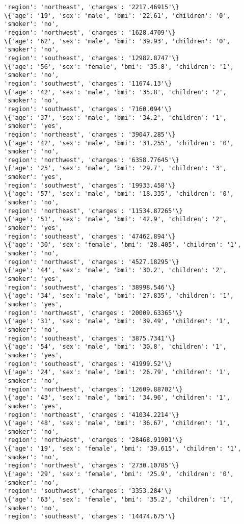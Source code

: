 \documentclass[11pt]{article}
\begin{document}
\begin{Verbatim}[commandchars=\\\{\}]
'region': 'northeast', 'charges': '2217.46915'\}
\{'age': '19', 'sex': 'male', 'bmi': '22.61', 'children': '0', 'smoker': 'no',
'region': 'northwest', 'charges': '1628.4709'\}
\{'age': '62', 'sex': 'male', 'bmi': '39.93', 'children': '0', 'smoker': 'no',
'region': 'southeast', 'charges': '12982.8747'\}
\{'age': '56', 'sex': 'female', 'bmi': '35.8', 'children': '1', 'smoker': 'no',
'region': 'southwest', 'charges': '11674.13'\}
\{'age': '42', 'sex': 'male', 'bmi': '35.8', 'children': '2', 'smoker': 'no',
'region': 'southwest', 'charges': '7160.094'\}
\{'age': '37', 'sex': 'male', 'bmi': '34.2', 'children': '1', 'smoker': 'yes',
'region': 'northeast', 'charges': '39047.285'\}
\{'age': '42', 'sex': 'male', 'bmi': '31.255', 'children': '0', 'smoker': 'no',
'region': 'northwest', 'charges': '6358.77645'\}
\{'age': '25', 'sex': 'male', 'bmi': '29.7', 'children': '3', 'smoker': 'yes',
'region': 'southwest', 'charges': '19933.458'\}
\{'age': '57', 'sex': 'male', 'bmi': '18.335', 'children': '0', 'smoker': 'no',
'region': 'northeast', 'charges': '11534.87265'\}
\{'age': '51', 'sex': 'male', 'bmi': '42.9', 'children': '2', 'smoker': 'yes',
'region': 'southeast', 'charges': '47462.894'\}
\{'age': '30', 'sex': 'female', 'bmi': '28.405', 'children': '1', 'smoker': 'no',
'region': 'northwest', 'charges': '4527.18295'\}
\{'age': '44', 'sex': 'male', 'bmi': '30.2', 'children': '2', 'smoker': 'yes',
'region': 'southwest', 'charges': '38998.546'\}
\{'age': '34', 'sex': 'male', 'bmi': '27.835', 'children': '1', 'smoker': 'yes',
'region': 'northwest', 'charges': '20009.63365'\}
\{'age': '31', 'sex': 'male', 'bmi': '39.49', 'children': '1', 'smoker': 'no',
'region': 'southeast', 'charges': '3875.7341'\}
\{'age': '54', 'sex': 'male', 'bmi': '30.8', 'children': '1', 'smoker': 'yes',
'region': 'southeast', 'charges': '41999.52'\}
\{'age': '24', 'sex': 'male', 'bmi': '26.79', 'children': '1', 'smoker': 'no',
'region': 'northwest', 'charges': '12609.88702'\}
\{'age': '43', 'sex': 'male', 'bmi': '34.96', 'children': '1', 'smoker': 'yes',
'region': 'northeast', 'charges': '41034.2214'\}
\{'age': '48', 'sex': 'male', 'bmi': '36.67', 'children': '1', 'smoker': 'no',
'region': 'northwest', 'charges': '28468.91901'\}
\{'age': '19', 'sex': 'female', 'bmi': '39.615', 'children': '1', 'smoker': 'no',
'region': 'northwest', 'charges': '2730.10785'\}
\{'age': '29', 'sex': 'female', 'bmi': '25.9', 'children': '0', 'smoker': 'no',
'region': 'southwest', 'charges': '3353.284'\}
\{'age': '63', 'sex': 'female', 'bmi': '35.2', 'children': '1', 'smoker': 'no',
'region': 'southeast', 'charges': '14474.675'\}

\end{Verbatim}
\end{document}
